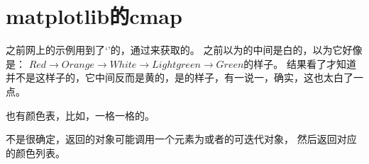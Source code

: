 \section{matplotlib的cmap}

之前网上的示例用到了`'的，通过来获取的。
之前以为的中间是白的，以为它好像是：
$Red\to Orange\to White\to Light green\to Green$的样子。
结果看了才知道并不是这样子的，它中间反而是黄的，是的样子，有一说一，确实，这也太白了一点。

也有颜色表，比如，一格一格的。

不是很确定，返回的对象可能调用一个元素为或者的可迭代对象，
然后返回对应的颜色列表。
